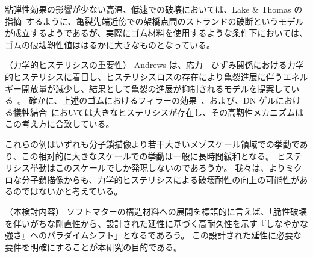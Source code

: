 \documentclass[10pt]{jsarticle}
\makeatletter
\def\subsection{\@startsection{subsection}{2}{\z@}{0.2\Cvs \@plus.5\Cdp \@minus.2\Cdp}{0.1\Cvs \@plus.3\Cdp}{\reset@font\normalsize\bfseries}}
\makeatother
\begin{document}
粘弾性効果の影響が少ない高温、低速での破壊においては、Lake \& Thomas の指摘~\cite{Lake1967}するように、亀裂先端近傍での架橋点間のストランドの破断というモデルが成立するようであるが、実際にゴム材料を使用するような条件下においては、ゴムの破壊靭性値ははるかに大きなものとなっている。



（力学的ヒステリシスの重要性）
Andrews は、応力 - ひずみ関係における力学的ヒステリシスに着目し、ヒステリシスロスの存在により亀裂進展に伴うエネルギー開放量が減少し、結果として亀裂の進展が抑制されるモデルを提案している~\cite{Andrews1977}。
確かに、上述のゴムにおけるフィラーの効果~\cite{Igarashi2013}、および、DN ゲルにおける犠牲結合~\cite{Gong2010}においては大きなヒステリシスが存在し、その高靭性メカニズムはこの考え方に合致している。

これらの例はいずれも分子鎖描像より若干大きいメゾスケール領域での挙動であり、この相対的に大きなスケールでの挙動は一般に長時間緩和となる。
ヒステリシス挙動はこのスケールでしか発現しないのであろうか。
我々は、よりミクロな分子鎖描像からも、力学的ヒステリシスによる破壊耐性の向上の可能性があるのではないかと考えている。




%
%
%



（本検討内容）
ソフトマターの構造材料への展開を標語的に言えば、「脆性破壊を伴いがちな剛直性から、設計された延性に基づく高耐久性を示す『しなやかな強さ』へのパラダイムシフト」となるであろう。
この設計された延性に必要な要件を明確にすることが本研究の目的である。
\end{document}
